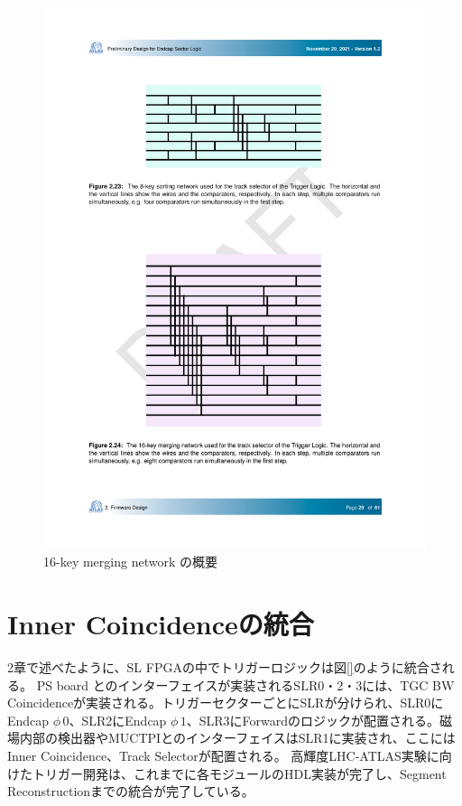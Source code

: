 \begin{figure} 
\centering
\includegraphics[width=16cm]{fig/SL/Sorting_16.pdf}
\caption[16-key merging network の概要]{16-key merging network の概要}
\label{Sorting_16}
\end{figure}


\newpage
\section{Inner Coincidenceの統合}
\label{sec_TriggerIntegration}
2章で述べたように、SL FPGAの中でトリガーロジックは図\ref{}のように統合される。
PS board とのインターフェイスが実装されるSLR0・2・3には、TGC BW Coincidenceが実装される。トリガーセクターごとにSLRが分けられ、SLR0にEndcap $\phi\,0$、SLR2にEndcap $\phi\,1$、SLR3にForwardのロジックが配置される。磁場内部の検出器やMUCTPIとのインターフェイスはSLR1に実装され、ここにはInner Coincidence、Track Selectorが配置される。
高輝度LHC-ATLAS実験に向けたトリガー開発は、これまでに各モジュールのHDL実装が完了し、Segment Reconstructionまでの統合が完了している。

